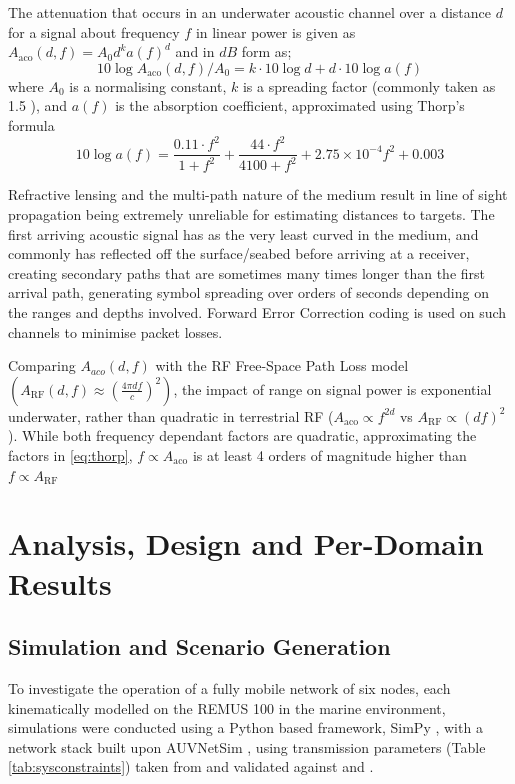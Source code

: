 \documentclass{aamas2016}
\begin{document}
The attenuation that occurs in an underwater acoustic channel over a distance $d$ for a signal about frequency $f$ in linear power is given as $A_{\text{aco}}(d,f) = A_0d^ka(f)^d$ and in $dB$ form as;
%
\begin{equation}
\label{eq:acoattenuationdb}
10 \log A_{\text{aco}}(d,f)/A_0 = k \cdot 10 \log d + d \cdot 10 \log a(f)
\end{equation}
%
where $A_0$ is a normalising constant, $k$ is a spreading factor (commonly taken as 1.5  \cite{Stojanovic2007}), and $a(f)$ is the absorption coefficient, approximated using Thorp's formula \cite{Stefanov2011}
%
\begin{equation}
\label{eq:thorp}
10 \log a(f) = \frac{0.11 \cdot f^2}{1+f^2} + \frac{44\cdot f^2}{4100+f^2}+ 2.75\times10^{-4} f^2 + 0.003
\end{equation}
%

Refractive lensing and the multi-path nature of the medium result in line of sight propagation being extremely unreliable for estimating distances to targets.
The first arriving acoustic signal has as the very least curved in the medium, and commonly has reflected off the surface/seabed before arriving at a receiver, creating secondary paths that are sometimes many times longer than the first arrival path, generating symbol spreading over orders of seconds depending on the ranges and depths involved.
Forward Error Correction coding is used on such channels to minimise packet losses.

Comparing $A_{aco}(d,f)$ with the RF Free-Space Path Loss model $(A_{\text{RF}}(d,f) \approx \left( \frac{4\pi d f}{c} \right)^2)$, the impact of range on signal power is exponential underwater, rather than quadratic in terrestrial RF ($A_{\text{aco}} \propto f^{2d}$ vs $A_{\text{RF}} \propto (df)^2$). 
While both frequency dependant factors are quadratic, approximating the factors in \eqref{eq:thorp}, $f\propto A_{\text{aco}}$ is at least 4 orders of magnitude higher than $f\propto A_{\text{RF}}$


\section{Analysis, Design and Per-Domain Results}

\subsection{Simulation and Scenario Generation}
To investigate the operation of a fully mobile network of six nodes, each kinematically modelled on the REMUS 100 \cite{Milgram2001} in the marine environment, simulations were conducted using a Python based framework, SimPy \cite{Mueller2003SimPy}, with a network stack built upon AUVNetSim \cite{Miquel2008}, using transmission parameters (Table \ref{tab:sysconstraints}) taken from and validated against \cite{Stojanovic2007} and \cite{Stefanov2011}.
\end{document}
